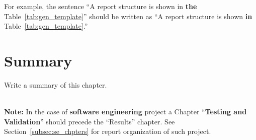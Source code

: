 For example, the sentence ``A report structure is shown in \textbf{the} Table~\ref{tab:gen_template}'' should be written as ``A report structure is shown \textbf{in} Table~\ref{tab:gen_template}.'' 
 

\section{Summary}
Write a summary of this chapter.

~\\[5em]
\noindent
{\huge\textbf{Note:}} In the case of \textbf{software engineering} project a Chapter ``\textbf{Testing and Validation}'' should precede the ``Results'' chapter. See Section~\ref{subsec:se_chpters} for report organization of such project. 

